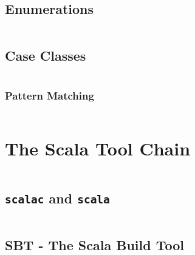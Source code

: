 \begin{lstlisting}[language=Scala]
\end{lstlisting}

\subsection{Enumerations}\label{sec:scala-enumerations}

\begin{lstlisting}[language=Scala]
\end{lstlisting}

\subsection{Case Classes}\label{sec:scala-case-classes}

\begin{lstlisting}[language=Scala]
\end{lstlisting}

\subsubsection{Pattern Matching}

\begin{lstlisting}[language=Scala]
\end{lstlisting}

\section{The Scala Tool Chain}

\begin{lstlisting}[language=Scala]
\end{lstlisting}

\subsection{{\tt scalac} and {\tt scala} }

\begin{lstlisting}[language=Scala]
\end{lstlisting}

\subsection{SBT - The Scala Build Tool}

\begin{lstlisting}[language=Scala]
\end{lstlisting}

